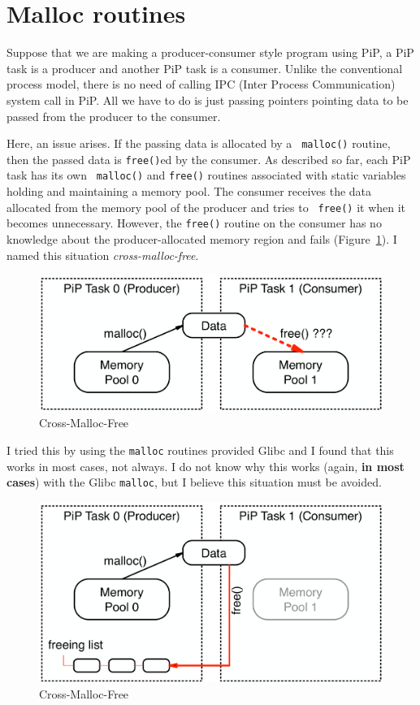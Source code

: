 
\section{Malloc routines}\label{sec:malloc}

Suppose that we are making a producer-consumer style program using PiP,
a PiP task is a producer and another PiP task is a consumer. Unlike the
conventional process model, there is no need of calling IPC (Inter
Process Communication) system call in PiP. All we have to do is just
passing pointers pointing data to be passed from the producer to the
consumer.

Here, an issue arises. If the passing data is allocated by a {\tt
  malloc()} routine, then the passed data is {\tt free()}ed by
the consumer. As described so far, each PiP task has its own {\tt
  malloc()} and {\tt free()} routines associated with static variables
holding and maintaining a memory pool. The consumer receives the data
allocated from the memory pool of the producer and tries to {\tt
  free()} it when it becomes unnecessary. However, the {\tt free()}
routine on the consumer has no knowledge about the producer-allocated
memory region and fails (Figure~\ref{fig:cross-malloc-free-issue}). I
named this situation {\it cross-malloc-free}. 

\begin{figure}[ht]
\centering
\includegraphics[width=0.7\columnwidth]{malloc/Figs/ProducerConsumer.pdf}
\caption{Cross-Malloc-Free}
\label{fig:cross-malloc-free-issue}
\end{figure}

I tried this by using the {\tt malloc} routines provided Glibc and I
found that this works in most cases, not always. I do not know why
this works (again, {\bf in most cases}) with the Glibc {\tt malloc},
but I believe this situation must be avoided.

\begin{figure}[ht]
\centering
\includegraphics[width=0.7\columnwidth]{malloc/Figs/CrossMallocFree.pdf}
\caption{Cross-Malloc-Free}
\label{fig:cross-malloc-free}
\end{figure}

